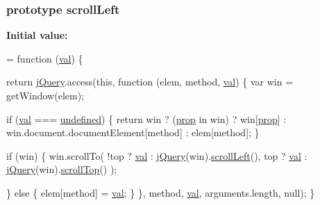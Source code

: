 \subsubsection[{\texorpdfstring{scroll\+Left}{scrollLeft}}]{ {\bf prototype} scroll\+Left}\hypertarget{jquery-2_82_81-vsdoc_8js_accc573ddf4124d723e9a6da272bb24f2}{}\label{jquery-2_82_81-vsdoc_8js_accc573ddf4124d723e9a6da272bb24f2}
{\bfseries Initial value\+:}
\begin{DoxyCode}
= \textcolor{keyword}{function} (\hyperlink{jquery-2_82_81-vsdoc_8js_a0888cacd53defa08fbb4972d54ece4b0}{val}) \{
        

        \textcolor{keywordflow}{return} \hyperlink{jquery-2_82_81-vsdoc_8js_add5237586d970a38a81f990e8eb28c6c}{jQuery}.access(\textcolor{keyword}{this}, \textcolor{keyword}{function} (elem, method, \hyperlink{jquery-2_82_81-vsdoc_8js_a0888cacd53defa08fbb4972d54ece4b0}{val}) \{
            var win = getWindow(elem);

            \textcolor{keywordflow}{if} (\hyperlink{jquery-2_82_81-vsdoc_8js_a0888cacd53defa08fbb4972d54ece4b0}{val} === \hyperlink{jquery-2_82_81-vsdoc_8js_a08113a236cc18d2a9d5ce27e638012be}{undefined}) \{
                \textcolor{keywordflow}{return} win ? (\hyperlink{jquery-2_82_81-vsdoc_8js_af17be84954030af6c2286f5da385d41b}{prop} in win) ? win[\hyperlink{jquery-2_82_81-vsdoc_8js_af17be84954030af6c2286f5da385d41b}{prop}] :
                    win.document.documentElement[method] :
                    elem[method];
            \}

            \textcolor{keywordflow}{if} (win) \{
                win.scrollTo(
                    !top ? \hyperlink{jquery-2_82_81-vsdoc_8js_a0888cacd53defa08fbb4972d54ece4b0}{val} : \hyperlink{jquery-2_82_81-vsdoc_8js_add5237586d970a38a81f990e8eb28c6c}{jQuery}(win).\hyperlink{jquery-2_82_81-vsdoc_8js_accc573ddf4124d723e9a6da272bb24f2}{scrollLeft}(),
                    top ? \hyperlink{jquery-2_82_81-vsdoc_8js_a0888cacd53defa08fbb4972d54ece4b0}{val} : \hyperlink{jquery-2_82_81-vsdoc_8js_add5237586d970a38a81f990e8eb28c6c}{jQuery}(win).\hyperlink{jquery-2_82_81-vsdoc_8js_a1b81b50a7190916ff4f07febc824b85d}{scrollTop}()
                );

            \} \textcolor{keywordflow}{else} \{
                elem[method] = \hyperlink{jquery-2_82_81-vsdoc_8js_a0888cacd53defa08fbb4972d54ece4b0}{val};
            \}
        \}, method, \hyperlink{jquery-2_82_81-vsdoc_8js_a0888cacd53defa08fbb4972d54ece4b0}{val}, arguments.length, null);
    \}
\end{DoxyCode}
